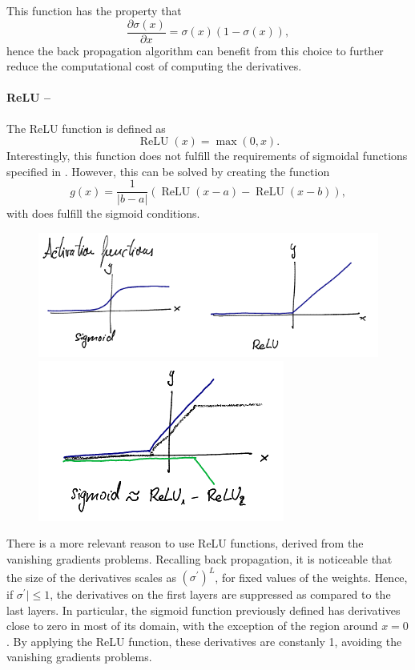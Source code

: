 \documentclass[]{report}
\begin{document}
This function has the property that
\begin{equation}
\frac{\partial \sigma(x)}{\partial x} = \sigma(x)(1 - \sigma(x)), 
\end{equation}
hence the back propagation algorithm can benefit from this choice to further reduce the computational cost of computing the derivatives. 

\paragraph{ReLU --}
The ReLU function is defined as
\begin{equation}
\operatorname{ReLU}(x) = \max(0, x).
\end{equation}
Interestingly, this function does not fulfill the requirements of sigmoidal functions specified in . However, this can be solved by creating the function
\begin{equation}
g(x) = \frac{1}{\vert b - a\vert } \left(\operatorname{ReLU}(x - a) - \operatorname{ReLU}(x - b)\right), 
\end{equation}
with does fulfill the sigmoid conditions. 

\begin{figure}
\includegraphics[width = .7\linewidth]{images/activation functions}
\includegraphics[width = .35\linewidth]{images/sigmoid relu}
\end{figure}

There is a more relevant reason to use ReLU functions, derived from the vanishing gradients problems. Recalling back propagation, it is noticeable that the size of the derivatives scales as $(\sigma^\prime)^L$, for fixed values of the weights. Hence, if $\sigma^\prime \vert \leq 1$, the derivatives on the first layers are suppressed as compared to the last layers. In particular, the sigmoid function previously defined has derivatives close to zero in most of its domain, with the exception of the region around $x = 0$. By applying the ReLU function, these derivatives are constanly 1, avoiding the vanishing gradients problems. 
\end{document}
